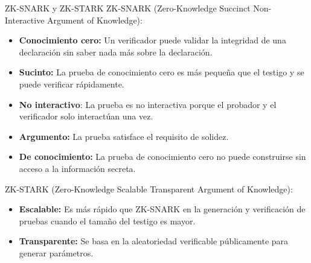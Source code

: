 \documentclass[8pt,xcolor=dvipsnames]{beamer}
\begin{document}
\begin{frame}[fragile]{ZK-SNARK y ZK-STARK}
    ZK-SNARK (Zero-Knowledge Succinct Non-Interactive Argument of Knowledge):
    \begin{itemize}
        \item \textbf{Conocimiento cero:} Un verificador puede validar la integridad de una declaración sin saber nada más sobre la declaración.
        \item \textbf{Sucinto:} La prueba de conocimiento cero es más pequeña que el testigo y se puede verificar rápidamente.
        \item \textbf{No interactivo}: La prueba es no interactiva porque el probador y el verificador solo interactúan una vez.
        \item \textbf{Argumento:} La prueba satisface el requisito de solidez.
        \item \textbf{De conocimiento:} La prueba de conocimiento cero no puede construirse sin acceso a la información secreta.
    \end{itemize}

    ZK-STARK (Zero-Knowledge Scalable Transparent Argument of Knowledge):
    \begin{itemize}
        \item \textbf{Escalable:} Es más rápido que ZK-SNARK en la generación y verificación de pruebas cuando el tamaño del testigo es mayor.
        \item \textbf{Transparente:} Se basa en la aleatoriedad verificable públicamente para generar parámetros.
    \end{itemize}
\end{frame}

\end{document}
